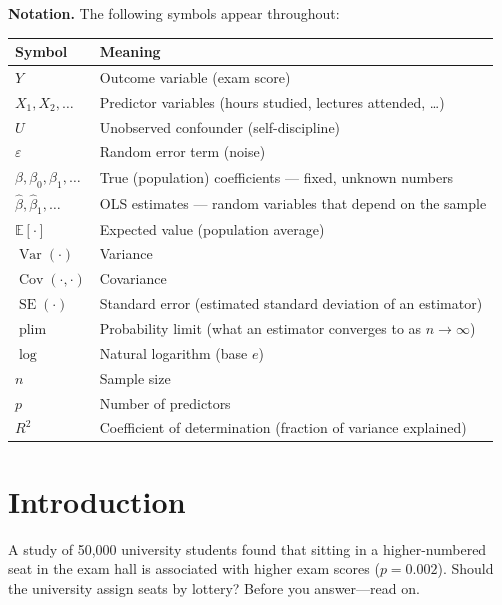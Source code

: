\documentclass[11pt,a4paper]{article}
\theoremstyle{definition}
\theoremstyle{plain}
\theoremstyle{remark}
\newcommand{\E}{\mathbb{E}}
\newcommand{\Var}{\operatorname{Var}}
\newcommand{\Cov}{\operatorname{Cov}}
\newcommand{\se}{\operatorname{SE}}
\newcommand{\plim}{\operatorname{plim}}
\newcommand{\bhat}{\hat{\beta}}
\begin{document}
\textbf{Notation.} The following symbols appear throughout:
\begin{center}
\begin{tabular}{@{}ll@{}}
\toprule
\textbf{Symbol} & \textbf{Meaning} \\
\midrule
$Y$ & Outcome variable (exam score) \\
$X_1, X_2, \ldots$ & Predictor variables (hours studied, lectures attended, \ldots) \\
$U$ & Unobserved confounder (self-discipline) \\
$\varepsilon$ & Random error term (noise) \\
$\beta, \beta_0, \beta_1, \ldots$ & True (population) coefficients --- fixed, unknown numbers \\
$\bhat, \bhat_1, \ldots$ & OLS estimates --- random variables that depend on the sample \\
$\E[\cdot]$ & Expected value (population average) \\
$\Var(\cdot)$ & Variance \\
$\Cov(\cdot, \cdot)$ & Covariance \\
$\se(\cdot)$ & Standard error (estimated standard deviation of an estimator) \\
$\plim$ & Probability limit (what an estimator converges to as $n \to \infty$) \\
$\log$ & Natural logarithm (base $e$) \\
$n$ & Sample size \\
$p$ & Number of predictors \\
$R^2$ & Coefficient of determination (fraction of variance explained) \\
\bottomrule
\end{tabular}
\end{center}

\newpage

\section{Introduction}\label{sec:intro}

\begin{coldopen}
A study of 50{,}000 university students found that sitting in a higher-numbered seat in the exam hall is associated with higher exam scores ($p = 0.002$). Should the university assign seats by lottery? Before you answer---read on.
\end{coldopen}
\end{document}
